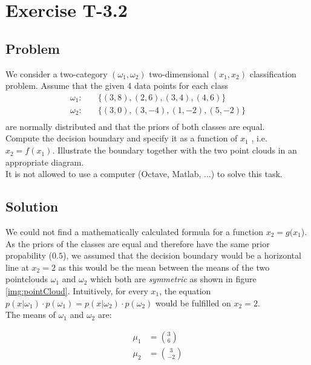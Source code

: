 \section*{Exercise T-3.2}
\subsection*{Problem}
We consider a two-category $(\omega_1 , \omega_2 )$ two-dimensional $(x_1, x_2 )$ classification problem. Assume that the given 4 data points for each class
\begin{align}
\omega_1 :& \quad \{(3,8),(2,6),(3,4),(4,6)\}\nonumber\\ 
\omega_2 :& \quad \{(3,0),(3,-4),(1,-2),(5,-2)\}\nonumber\\ \nonumber
\end{align}
are normally distributed and that the priors of both classes are equal.\\

Compute the decision boundary and specify it as a function of $x_1$ , i.e. $x_2 = f (x_1 )$. Illustrate the boundary together with the two point clouds in an appropriate diagram.\\

It is not allowed to use a computer (Octave, Matlab, ...) to solve this task.

\subsection*{Solution}

We could not find a mathematically calculated formula for a function $x_2=g(x_1$).\\
As the priors of the classes are equal and therefore have the same prior propability ($0.5$), we assumed that the decision boundary would be a horizontal line at $x_2=2$ as this would be the mean between the means of the two pointclouds $\omega_1$ and $\omega_2$ which both are \textit{symmetric} as shown in figure \ref{img:pointCloud}. Intuitively, for every $x_1$, the equation $p(x|\omega_1)\cdot p(\omega_1) = p(x|\omega_2)\cdot p(\omega_2)$ would be fulfilled on $x_2=2$.\\

The means of $\omega_1$ and $\omega_2$ are:

\begin{align}
	\mu_1 &= \binom{3}{6} \nonumber\\
	\mu_2 &= \binom{3}{-2} \nonumber
\end{align}

